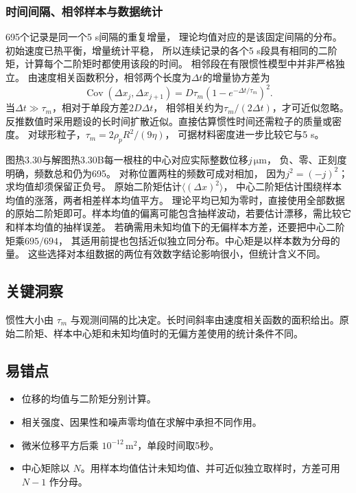 \documentclass[UTF8,fontset=fandol,a4paper,11pt]{ctexart}
\begin{document}
\subsubsection*{时间间隔、相邻样本与数据统计}
695个记录是同一个5 s间隔的重复增量，
理论均值对应的是该固定间隔的分布。
初始速度已热平衡，增量统计平稳，
所以连续记录的各个5 s段具有相同的二阶矩，计算每个二阶矩时都使用该段的时间。
相邻段在有限惯性模型中并非严格独立。
由速度相关函数积分，相邻两个长度为$\Delta t$的增量协方差为
\[
\operatorname{Cov}(\Delta x_j,\Delta x_{j+1})
=D\tau_m(1-e^{-\Delta t/\tau_m})^2.
\]
当$\Delta t\gg\tau_m$，相对于单段方差$2D\Delta t$，
相邻相关约为$\tau_m/(2\Delta t)$，才可近似忽略。
反推数值时采用题设的长时间扩散近似。直接估算惯性时间还需粒子的质量或密度。
对球形粒子，$\tau_m=2\rho_pR^2/(9\eta)$，
可据材料密度进一步比较它与5 s。

图热3.30与解图热3.30B每一根柱的中心对应实际整数位移$j\,\mathrm{\mu m}$，
负、零、正刻度明确，频数总和仍为695。
对称位置两柱的频数可成对相加，
因为$j^2=(-j)^2$；求均值却须保留正负号。
原始二阶矩估计$\langle(\Delta x)^2\rangle$，
中心二阶矩估计围绕样本均值的涨落，两者相差样本均值平方。
理论平均已知为零时，直接使用全部数据的原始二阶矩即可。样本均值的偏离可能包含抽样波动，若要估计漂移，需比较它和样本均值的抽样误差。
若确需用未知均值下的无偏样本方差，还要把中心二阶矩乘$695/694$，
其适用前提也包括近似独立同分布。中心矩是以样本数为分母的量。
这些选择对本组数据的两位有效数字结论影响很小，但统计含义不同。




\subsection*{关键洞察}

惯性大小由 $\tau_m$ 与观测间隔的比决定。长时间斜率由速度相关函数的面积给出。原始二阶矩、样本中心矩和未知均值时的无偏方差使用的统计条件不同。



\subsection*{易错点}

\begin{itemize}
\item 位移的均值与二阶矩分别计算。
\item 相关强度、因果性和噪声零均值在求解中承担不同作用。
\item 微米位移平方后乘 $10^{-12}\,\mathrm{m^2}$，单段时间取5秒。
\item 中心矩除以 $N$。用样本均值估计未知均值、并可近似独立取样时，方差可用 $N-1$ 作分母。
\end{itemize}
\end{document}
